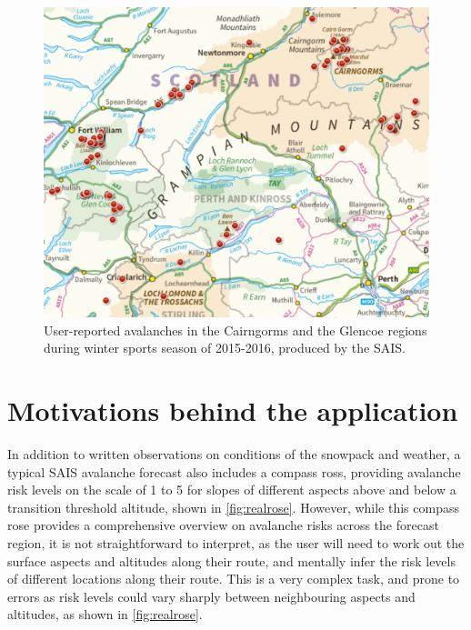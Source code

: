 \documentclass[openany]{UoYCSproject}
\begin{document}
\begin{figure}[h]
		\centering
		\includegraphics[scale=0.4]{ScotAvalanches1516.png}
		\caption{\label{fig:scotava1516} User-reported avalanches in the Cairngorms and the Glencoe regions during winter sports season of 2015-2016, produced by the SAIS.\cite{sais-map}}
\end{figure}

\section{Motivations behind the application}

In addition to written observations on conditions of the snowpack and weather, a typical SAIS avalanche forecast also includes a compass ross, providing avalanche risk levels on the scale of 1 to 5 for slopes of different aspects above and below a transition threshold altitude, shown in \ref{fig:realrose}. However, while this compass rose provides a comprehensive overview on avalanche risks across the forecast region, it is not straightforward to interpret, as the user will need to work out the surface aspects and altitudes along their route, and mentally infer the risk levels of different locations along their route. This is a very complex task, and prone to errors as risk levels could vary sharply between neighbouring aspects and altitudes, as shown in \ref{fig:realrose}.
\end{document}
